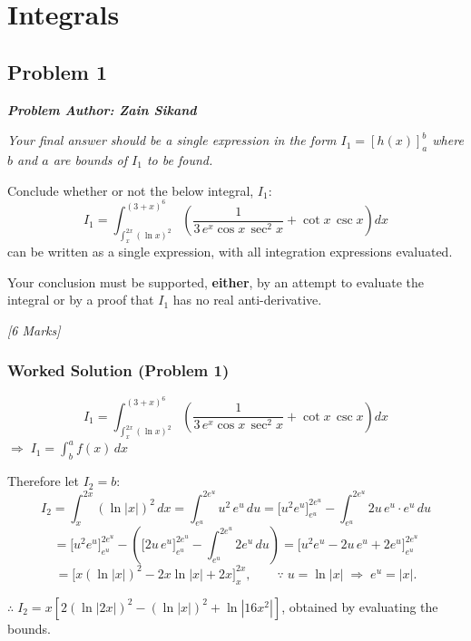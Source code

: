 \documentclass[openany,oneside,12pt,hidelinks]{book}
\newcommand{\problemmeta}[1]{%
  \begin{cataloguebox}\textbf{\emph{#1}}\end{cataloguebox}%
}
\begin{document}
\newpage

\section{Integrals}

\subsection{Problem 1}

\problemmeta{Problem Author: Zain Sikand}

\textit{Your final answer should be a single expression in the form
\(I_1=[h(x)]_{a}^{b}\) where \(b\) and \(a\) are bounds of \(I_1\) to be found.}

Conclude whether or not the below integral, \(I_1\):
\[
  I_{1}
  = \int_{\int_{x}^{2x}(\ln x)^{2}}^{(3+x)^{6}}
  \left(
  \frac{1}{3\,e^{x}\cos x\,\sec^{2}x}
  + \cot x\,\csc x
  \right) dx
\]
can be written as a single expression, with all integration expressions
evaluated.

Your conclusion must be supported, \textbf{either}, by an attempt to evaluate
the integral or by a proof that \(I_{1}\) has no real anti-derivative.

\hfill\textit{[6 Marks]}

\newpage
\subsubsection{Worked Solution (Problem 1)}

\[
  I_{1}
  = \int_{\int_{x}^{2x}(\ln x)^{2}}^{(3+x)^{6}}
  \left(
  \frac{1}{3\,e^{x}\cos x\,\sec^{2}x}
  + \cot x\,\csc x
  \right) dx
\]
\(\Rightarrow\; I_{1}=\displaystyle\int_{b}^{a} f(x)\,dx\)

Therefore let \(I_{2}=b\):
\[
  I_2
  = \int_{x}^{2x}(\ln|x|)^{2}\,dx
  = \int_{e^{u}}^{2e^{u}} u^{2}\,e^{u}\,du
  = \Big[u^{2}e^{u}\Big]_{e^{u}}^{2e^{u}}
  - \int_{e^{u}}^{2e^{u}} 2u\,e^{u}\cdot e^{u}\,du
\]
\[
  = \Big[u^{2}e^{u}\Big]_{e^{u}}^{2e^{u}}
  - \left(
  \Big[2u\,e^{u}\Big]_{e^{u}}^{2e^{u}}
  - \int_{e^{u}}^{2e^{u}} 2e^{u}\,du
  \right)
  = \Big[u^{2}e^{u} - 2u\,e^{u} +2e^{u}\Big]_{e^{u}}^{2e^{u}}
\]
\[
  = \Big[x(\ln|x|)^{2} - 2x\ln|x| + 2x\Big]_{x}^{2x},
  \qquad
  \because\; u=\ln|x| \;\Rightarrow\; e^{u}=|x|.
\]

\(\therefore\; I_2 = x\!\left[2(\ln|2x|)^{2} - (\ln|x|)^{2} + \ln|16x^{2}|\right]\),
\quad obtained by evaluating the bounds.
\end{document}
